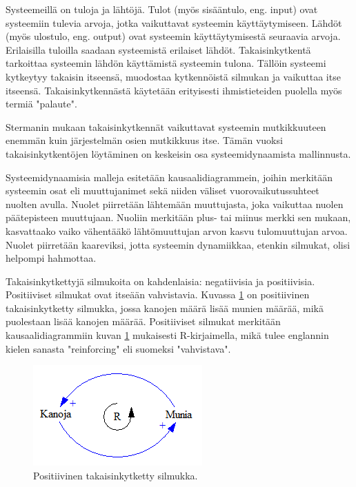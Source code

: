 \documentclass[finnish,12pt,a4paper,pdftex]{article}
\begin{document}
\begin{onehalfspacing}
Systeemeillä on tuloja ja lähtöjä. Tulot (myös sisääntulo, eng. input) ovat systeemiin tulevia arvoja, jotka vaikuttavat systeemin käyttäytymiseen. Lähdöt (myös ulostulo, eng. output) ovat systeemin käyttäytymisestä seuraavia arvoja. Erilaisilla tuloilla saadaan systeemistä erilaiset lähdöt. Takaisinkytkentä tarkoittaa systeemin lähdön käyttämistä systeemin tulona. Tällöin systeemi kytkeytyy takaisin itseensä, muodostaa kytkennöistä silmukan ja vaikuttaa itse itseensä. Takaisinkytkennästä käytetään erityisesti ihmistieteiden puolella myös termiä "palaute". \cite{Sterman2000} %

Stermanin \cite[s. 12]{Sterman2000} mukaan takaisinkytkennät vaikuttavat systeemin mutkikkuuteen enemmän kuin järjestelmän osien mutkikkuus itse. Tämän vuoksi takaisinkytkentöjen löytäminen on keskeisin osa systeemidynaamista mallinnusta. 

Systeemidynaamisia malleja esitetään kausaalidiagrammein, joihin merkitään systeemin osat eli muuttujanimet sekä niiden väliset vuorovaikutussuhteet nuolten avulla. Nuolet piirretään lähtemään muuttujasta, joka vaikuttaa nuolen päätepisteen muuttujaan. Nuoliin merkitään plus- tai miinus merkki sen mukaan, kasvattaako vaiko vähentääkö lähtömuuttujan arvon kasvu tulomuuttujan arvoa. Nuolet piirretään kaareviksi, jotta systeemin dynamiikkaa, etenkin silmukat, olisi helpompi hahmottaa. 

Takaisinkytkettyjä silmukoita on kahdenlaisia: negatiivisia ja positiivisia. Positiiviset silmukat ovat itseään vahvistavia. Kuvassa \ref{positiivinen} on positiivinen takaisinkytketty silmukka, jossa kanojen määrä lisää munien määrää, mikä puolestaan lisää kanojen määrää. Positiiviset silmukat merkitään kausaalidiagrammiin kuvan \ref{positiivinen} mukaisesti R-kirjaimella, mikä tulee englannin kielen sanasta "reinforcing" eli suomeksi "vahvistava". \cite[s. 12--13]{Sterman2000}

\begin{figure}[H]
\centering \includegraphics{positiivinen}
\caption{Positiivinen takaisinkytketty silmukka. \cite[s. 13]{Sterman2000} \label{positiivinen}}
\end{figure}


\end{onehalfspacing}
\end{document}
